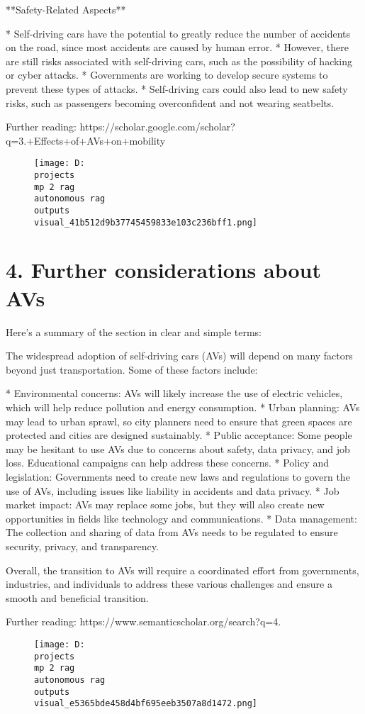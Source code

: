 \documentclass[12pt,a4paper]{article}
\begin{document}
**Safety-Related Aspects**

* Self-driving cars have the potential to greatly reduce the number of accidents on the road, since most accidents are caused by human error.
* However, there are still risks associated with self-driving cars, such as the possibility of hacking or cyber attacks.
* Governments are working to develop secure systems to prevent these types of attacks.
* Self-driving cars could also lead to new safety risks, such as passengers becoming overconfident and not wearing seatbelts.

Further reading: https://scholar.google.com/scholar?q=3.+Effects+of+AVs+on+mobility
\begin{figure}[h]
\centering
\texttt{[image: D:\\projects\\mp 2 rag\\autonomous rag\\outputs\\visual\_41b512d9b37745459833e103c236bff1.png]}
\end{figure}
\section{4. Further considerations about AVs}
Here's a summary of the section in clear and simple terms:

The widespread adoption of self-driving cars (AVs) will depend on many factors beyond just transportation. Some of these factors include:

* Environmental concerns: AVs will likely increase the use of electric vehicles, which will help reduce pollution and energy consumption.
* Urban planning: AVs may lead to urban sprawl, so city planners need to ensure that green spaces are protected and cities are designed sustainably.
* Public acceptance: Some people may be hesitant to use AVs due to concerns about safety, data privacy, and job loss. Educational campaigns can help address these concerns.
* Policy and legislation: Governments need to create new laws and regulations to govern the use of AVs, including issues like liability in accidents and data privacy.
* Job market impact: AVs may replace some jobs, but they will also create new opportunities in fields like technology and communications.
* Data management: The collection and sharing of data from AVs needs to be regulated to ensure security, privacy, and transparency.

Overall, the transition to AVs will require a coordinated effort from governments, industries, and individuals to address these various challenges and ensure a smooth and beneficial transition.

Further reading: https://www.semanticscholar.org/search?q=4.%
\begin{figure}[h]
\centering
\texttt{[image: D:\\projects\\mp 2 rag\\autonomous rag\\outputs\\visual\_e5365bde458d4bf695eeb3507a8d1472.png]}
\end{figure}
\end{document}
